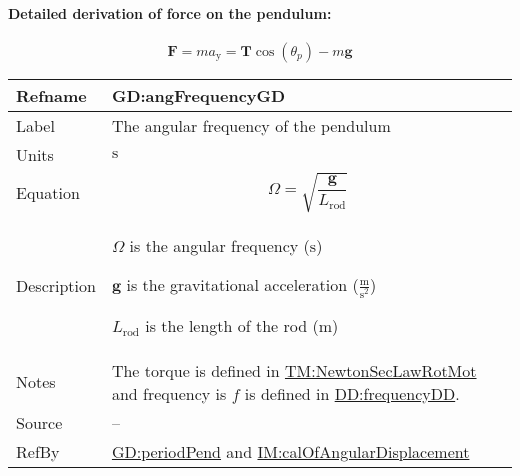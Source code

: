 \documentclass[12pt]{article}
\begin{document}
\paragraph{Detailed derivation of force on the pendulum:}
\label{GD:vForceOnPendulumDeriv}
\begin{displaymath}
\symbf{F}=m {a_{\text{y}}}=\symbf{T} \cos\left({θ_{p}}\right)-m \symbf{g}
\end{displaymath}
\vspace{\baselineskip}
\noindent
\begin{minipage}{\textwidth}
\begin{tabular}{>{\raggedright}p{}>{\raggedright\arraybackslash}p{}}
\toprule \textbf{Refname} & \textbf{GD:angFrequencyGD}
\label{GD:angFrequencyGD}
\\ \midrule
Label & The angular frequency of the pendulum
        
\\ \midrule
Units & ${\text{s}}$
        
\\ \midrule
Equation & \begin{displaymath}
           Ω=\sqrt{\frac{\symbf{g}}{{L_{\text{rod}}}}}
           \end{displaymath}
\\ \midrule
Description & \begin{symbDescription}
              \item{$Ω$ is the angular frequency (${\text{s}}$)}
              \item{$\symbf{g}$ is the gravitational acceleration ($\frac{\text{m}}{\text{s}^{2}}$)}
              \item{${L_{\text{rod}}}$ is the length of the rod (${\text{m}}$)}
              \end{symbDescription}
\\ \midrule
Notes & The torque is defined in \hyperref[TM:NewtonSecLawRotMot]{TM:NewtonSecLawRotMot} and frequency is $f$ is defined in \hyperref[DD:frequencyDD]{DD:frequencyDD}.
        
\\ \midrule
Source & --
         
\\ \midrule
RefBy & \hyperref[GD:periodPend]{GD:periodPend} and \hyperref[IM:calOfAngularDisplacement]{IM:calOfAngularDisplacement}
        
\\ \bottomrule
\end{tabular}
\end{minipage}
\end{document}
